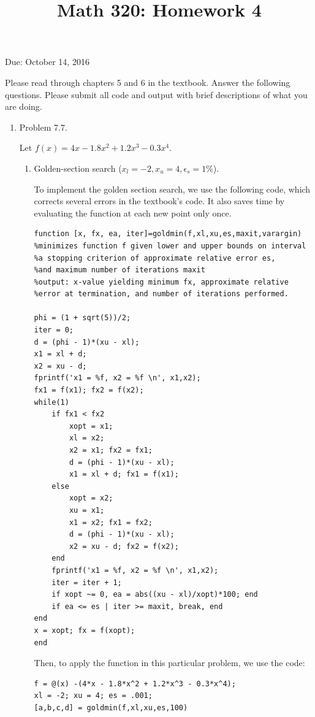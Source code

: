 \documentclass[12pt]{amsart}
\begin{document}
\title{Math 320: Homework 4}
Due: October 14, 2016
\maketitle

Please read through chapters 5 and 6 in the textbook.
Answer the following questions. Please submit all code
and output with brief descriptions of what you are doing.

\vspace{5mm}

\begin{enumerate}

\item Problem 7.7.

Let $f(x) = 4x -  1.8x^2 + 1.2x^3 - 0.3x^4$.
\begin{enumerate}
\item Golden-section search ($x_l = -2, x_u = 4, \epsilon_s = 1\%$).

To implement the golden section search, we use the following code,
which corrects several errors in the textbook's code. It also
saves time by evaluating the function at each new point only once.

\begin{verbatim}
function [x, fx, ea, iter]=goldmin(f,xl,xu,es,maxit,varargin)
%minimizes function f given lower and upper bounds on interval
%a stopping criterion of approximate relative error es,
%and maximum number of iterations maxit
%output: x-value yielding minimum fx, approximate relative 
%error at termination, and number of iterations performed.

phi = (1 + sqrt(5))/2;
iter = 0;
d = (phi - 1)*(xu - xl);
x1 = xl + d; 
x2 = xu - d;
fprintf('x1 = %f, x2 = %f \n', x1,x2);
fx1 = f(x1); fx2 = f(x2);
while(1)
    if fx1 < fx2
        xopt = x1;
        xl = x2;
        x2 = x1; fx2 = fx1;
        d = (phi - 1)*(xu - xl);
        x1 = xl + d; fx1 = f(x1);
    else
        xopt = x2;
        xu = x1;
        x1 = x2; fx1 = fx2;
        d = (phi - 1)*(xu - xl);
        x2 = xu - d; fx2 = f(x2);
    end
    fprintf('x1 = %f, x2 = %f \n', x1,x2);
    iter = iter + 1;
    if xopt ~= 0, ea = abs((xu - xl)/xopt)*100; end
    if ea <= es | iter >= maxit, break, end
end
x = xopt; fx = f(xopt);
end

\end{verbatim}

Then, to apply the function in this particular problem,
we use the code: 
\begin{verbatim}
f = @(x) -(4*x - 1.8*x^2 + 1.2*x^3 - 0.3*x^4);
xl = -2; xu = 4; es = .001;
[a,b,c,d] = goldmin(f,xl,xu,es,100)
\end{verbatim}


\end{enumerate}
\end{enumerate}
\end{document}
